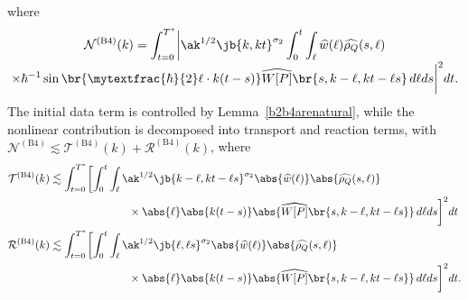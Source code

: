 \pagebreak[2]\noindent
where\vspace*{-5pt}
\begin{multline*}
\mathcal{N}^{\mathrm{(B4)}}(k)=\int_{t=0}^{T^*}\biggl|\ak^{1/2}\jb{k,kt}^{\sigma_2}\int_0^t\int_\ell\widehat w(\ell)\widehat{\rho_Q}(s,\ell) \\[-3pt]
\times\hbar^{-1}\sin\br{\mytextfrac{\hbar}{2}\ell\cdot k(t-s)}\widehat {W[P]}\br{s,k-\ell,kt-\ell s}\,d\ell ds\biggr|^2dt.
\end{multline*}
The initial data term is controlled by Lemma~\ref{b2b4arenatural}, while the nonlinear contribution is decomposed into transport and reaction terms, with $\mathcal{N}^{\mathrm{(B4)}}\lesssim \mathcal{T}^{\mathrm{(B4)}}(k)+\mathcal{R}^{\mathrm{(B4)}}(k)$, where\vspace*{-3pt}
\begin{align*}
\mathcal{T}^{\mathrm{(B4)}}(k)&\lesssim\int_{t=0}^{T^*}\biggl[\int_0^t\int_\ell\ak^{1/2}\jb{k-\ell,kt-\ell s}^{\sigma_2}\abs{\widehat w(\ell)}\abs{\widehat{\rho_Q}(s,\ell)} \\
&\hspace{2.5cm}\times\abs{\ell}\abs{k(t-s)}\abs{\widehat {W[P]}\br{s,k-\ell,kt-\ell s}}\,d\ell ds\biggr]^2dt\\
\mathcal{R}^{\mathrm{(B4)}}(k)&\lesssim\int_{t=0}^{T^*}\biggl[\int_0^t\int_\ell\ak^{1/2}\jb{\ell,\ell s}^{\sigma_2}\abs{\widehat w(\ell)}\abs{\widehat{\rho_Q}(s,\ell)} \\
&\hspace{2.5cm}\times\abs{\ell}\abs{k(t-s)}\abs{\widehat {W[P]}\br{s,k-\ell,kt-\ell s}}\,d\ell ds\biggr]^2dt.
\end{align*}

